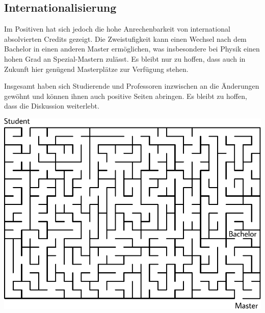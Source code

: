 \begin{multicols}{2}
\subsection{Internationalisierung}
Im Positiven hat sich jedoch die hohe Anrechenbarkeit von international absolvierten Credits gezeigt.
Die Zweistufigkeit kann einen Wechsel nach dem Bachelor in einen anderen Master ermöglichen, was insbesondere bei Physik einen hohen Grad an Spezial-Mastern zulässt.
Es bleibt nur zu hoffen, dass auch in Zukunft hier genügend Masterplätze zur Verfügung stehen.

Insgesamt haben sich Studierende und Professoren inzwischen an die Änderungen gewöhnt und können ihnen auch positive Seiten abringen.
Es bleibt zu hoffen, dass die Diskussion weiterlebt.

\end{multicols}

\begin{center}
	\includegraphics[width=\textwidth, height=0.38\textheight]{res/bachelor_master_labyrinth.pdf}
\end{center}
